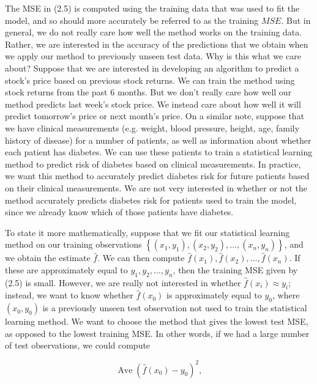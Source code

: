 \documentclass[10pt]{article}
\begin{document}
The MSE in (2.5) is computed using the training data that was used to fit the model, and so should more accurately be referred to as the training $M S E$. But in general, we do not really care how well the method works on the training data. Rather, we are interested in the accuracy of the predictions that we obtain when we apply our method to previously unseen test data. Why is this what we care about? Suppose that we are interested in developing an algorithm to predict a stock's price based on previous stock returns. We can train the method using stock returns from the past 6 months. But we don't really care how well our method predicts last week's stock price. We instead care about how well it will predict tomorrow's price or next month's price. On a similar note, suppose that we have clinical measurements (e.g. weight, blood pressure, height, age, family history of disease) for a number of patients, as well as information about whether each patient has diabetes. We can use these patients to train a statistical learning method to predict risk of diabetes based on clinical measurements. In practice, we want this method to accurately predict diabetes risk for future patients based on their clinical measurements. We are not very interested in whether or not the method accurately predicts diabetes risk for patients used to train the model, since we already know which of those patients have diabetes.

To state it more mathematically, suppose that we fit our statistical learning method on our training observations $\left\{\left(x_{1}, y_{1}\right),\left(x_{2}, y_{2}\right), \ldots,\left(x_{n}, y_{n}\right)\right\}$, and we obtain the estimate $\hat{f}$. We can then compute $\hat{f}\left(x_{1}\right), \hat{f}\left(x_{2}\right), \ldots, \hat{f}\left(x_{n}\right)$. If these are approximately equal to $y_{1}, y_{2}, \ldots, y_{n}$, then the training MSE given by (2.5) is small. However, we are really not interested in whether $\hat{f}\left(x_{i}\right) \approx y_{i}$; instead, we want to know whether $\hat{f}\left(x_{0}\right)$ is approximately equal to $y_{0}$, where $\left(x_{0}, y_{0}\right)$ is a previously unseen test observation not used to train the statistical learning method. We want to choose the method that gives the lowest test MSE, as opposed to the lowest training MSE. In other words, if we had a large number of test observations, we could compute


\begin{equation*}
\operatorname{Ave}\left(\hat{f}\left(x_{0}\right)-y_{0}\right)^{2}, \tag{2.6}
\end{equation*}
\end{document}
